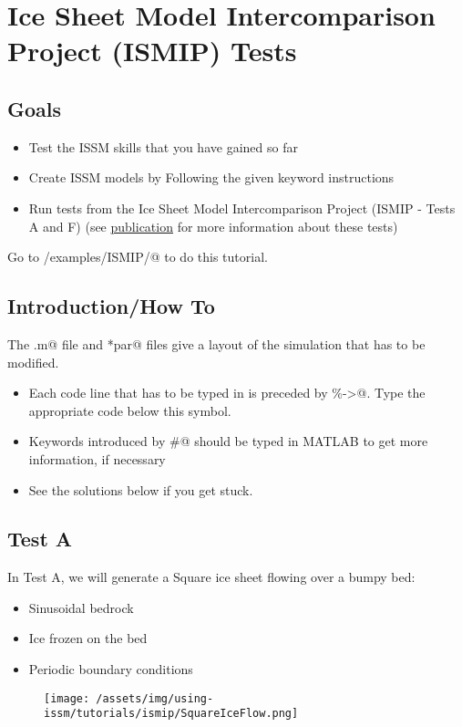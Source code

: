 \section{Ice Sheet Model Intercomparison Project (ISMIP) Tests}
\subsection{Goals} %
\begin{itemize}
	\item Test the ISSM skills that you have gained so far
	\item Create ISSM models by Following the given keyword instructions
	\item Run tests from the Ice Sheet Model Intercomparison Project (ISMIP - Tests A and F) (see \href{https://tc.copernicus.org/articles/2/95/2008/}{publication} for more information about these tests)
\end{itemize}

Go to \verb@trunk/examples/ISMIP/@ to do this tutorial.

\subsection{Introduction/How To} %
The \verb@runme.m@ file and \verb@*par@ files give a layout of the simulation that has to be modified.
\begin{itemize}
	\item Each code line that has to be typed in is preceded by \verb@\%->@. Type the appropriate code below this symbol.
	\item Keywords introduced by \verb@#@ should be typed in MATLAB to get more information, if necessary
	\item See the solutions below if you get stuck.
\end{itemize}
\subsection{Test A} %
In Test A, we will generate a Square ice sheet flowing over a bumpy bed:
\begin{itemize}
	\item Sinusoidal bedrock
	\item Ice frozen on the bed
	\item Periodic boundary conditions
\end{itemize}
\begin{figure}[H]
	\begin{center}
		\texttt{[image: /assets/img/using-issm/tutorials/ismip/SquareIceFlow.png]}
	\end{center}
\end{figure}

